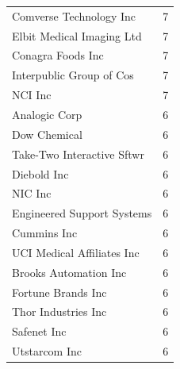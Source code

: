 \documentclass[conference]{IEEEtran}
\begin{document}
\begin{table}[htbp]
\begin{tabular}{@{}p{6.3cm}p{2.1cm}@{}}
\hspace{5mm}Comverse Technology Inc & 7\hspace{5mm} \\
\hspace{5mm}Elbit Medical Imaging Ltd & 7\hspace{5mm}  \\
\hspace{5mm}Conagra Foods Inc & 7\hspace{5mm} \\
\hspace{5mm}Interpublic Group of Cos & 7\hspace{5mm} \\
\hspace{5mm}NCI Inc & 7\hspace{5mm} \\
\hspace{5mm}Analogic Corp & 6\hspace{5mm} \\
\hspace{5mm}Dow Chemical & 6\hspace{5mm} \\
\hspace{5mm}Take-Two Interactive Sftwr & 6\hspace{5mm} \\
\hspace{5mm}Diebold Inc & 6\hspace{5mm} \\
\hspace{5mm}NIC Inc & 6\hspace{5mm} \\
\hspace{5mm}Engineered Support Systems & 6\hspace{5mm} \\
\hspace{5mm}Cummins Inc & 6\hspace{5mm} \\
\hspace{5mm}UCI Medical Affiliates Inc & 6\hspace{5mm} \\
\hspace{5mm}Brooks Automation Inc & 6\hspace{5mm} \\
\hspace{5mm}Fortune Brands Inc & 6\hspace{5mm} \\
\hspace{5mm}Thor Industries Inc & 6\hspace{5mm} \\
\hspace{5mm}Safenet Inc & 6\hspace{5mm} \\
\hspace{5mm}Utstarcom Inc & 6\hspace{5mm} \\
\bottomrule
\end{tabular}
\label{tab1}
\end{table}
\end{document}
